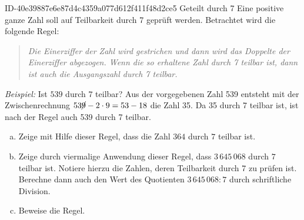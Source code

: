 \begin{exercise}
      {ID-40e39887e6e87d4c4359a077d612f411f48d2ce5}
      {Geteilt durch 7}
  \ifproblem\problem
    Eine positive ganze Zahl soll auf Teilbarkeit durch 7 geprüft werden.
    Betrachtet wird die folgende Regel:\par
    \begin{quote}
      \itshape
      Die Einerziffer der Zahl wird gestrichen und dann wird das Doppelte der
      Einerziffer abgezogen. Wenn die so erhaltene Zahl durch 7 teilbar ist,
      dann ist auch die Ausgangszahl durch 7 teilbar.
    \end{quote}
    \textit{Beispiel:} Ist $539$ durch $7$ teilbar? Aus der vorgegebenen Zahl 539
    entsteht mit der Zwischenrechnung $53\cancel9-2\cdot9=53-18$ die Zahl 35.
    Da 35 durch 7 teilbar ist, ist nach der Regel auch 539 durch 7 teilbar.
    \begin{enumerate}[a)]
      \item Zeige mit Hilfe dieser Regel, dass die Zahl $364$ durch $7$ teilbar ist.
      \item Zeige durch viermalige Anwendung dieser Regel, dass $3\,645\,068$ durch
            $7$ teilbar ist. Notiere hierzu die Zahlen, deren Teilbarkeit durch 7
            zu prüfen ist. Berechne dann auch den Wert des Quotienten $3\,645\,068:7$
            durch schriftliche Division.
      \item Beweise die Regel.
    \end{enumerate}
  \fi
\end{exercise}
